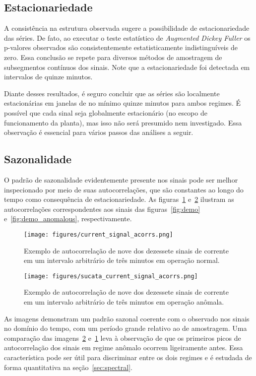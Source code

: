 \subsection{Estacionariedade}

A consistência na estrutura observada sugere a possibilidade de
estacionariedade das séries. De fato, ao executar o teste estatístico de
\emph{Augmented Dickey Fuller} os p-valores observados são consistentemente
estatisticamente indistinguíveis de zero. Essa conclusão se repete para
diversos métodos de amostragem de subsegmentos contínuos dos sinais. Note
que a estacionariedade foi detectada em intervalos de quinze minutos.

Diante desses resultados, é seguro concluir que as séries são localmente
estacionárias em janelas de no mínimo quinze minutos para ambos regimes. É
possível que cada sinal seja globalmente estacionário (no escopo de
funcionamento da planta), mas isso não será presumido nem investigado.
Essa observação é essencial para vários passos das análises a seguir.

\subsection{Sazonalidade}

O padrão de sazonalidade evidentemente presente nos sinais pode ser melhor
inspecionado por meio de suas autocorrelações, que são constantes ao longo do
tempo como consequência de estacionariedade. As figuras~\ref{fig:demo_acorrs}
e~\ref{fig:anomalous_demo_acorrs} ilustram as autocorrelações correspondentes
aos sinais das figuras~\ref{fig:demo} e~\ref{fig:demo_anomalous},
respectivamente.

\begin{figure}[H]
    \centering
    \texttt{[image: figures/current\_signal\_acorrs.png]}
    \caption{Exemplo de autocorrelação de nove dos dezessete sinais de corrente
    em um intervalo arbitrário de três minutos em operação normal.}
    \label{fig:demo_acorrs}
\end{figure}

\begin{figure}[H]
    \centering
    \texttt{[image: figures/sucata\_current\_signal\_acorrs.png]}
    \caption{Exemplo de autocorrelação de nove dos dezessete sinais de corrente
    em um intervalo arbitrário de três minutos em operação anômala.}
    \label{fig:anomalous_demo_acorrs}
\end{figure}

As imagens demonstram um padrão sazonal coerente com o observado nos sinais no
domínio do tempo, com um período grande relativo ao de amostragem. Uma
comparação das imagens~\ref{fig:anomalous_demo_acorrs} e~\ref{fig:demo_acorrs}
leva à observação de que os primeiros picos de autocorrelação dos sinais em
regime anômalo ocorrem ligeiramente antes. Essa característica pode ser útil
para discriminar entre os dois regimes e é estudada de forma quantitativa
na seção~\ref{sec:spectral}.

